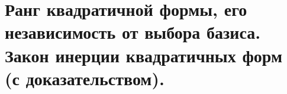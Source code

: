\section{
    Ранг квадратичной формы, его независимость от выбора базиса. Закон инерции квадратичных форм (с доказательством). 
}
